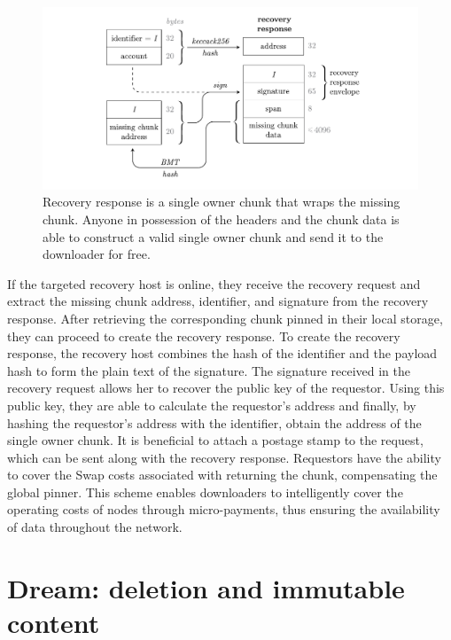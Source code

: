 \begin{figure}[htbp]
\centering
\includegraphics[width=\textwidth]{fig/recovery-response-2.pdf}
\caption[Recovery response \statusgreen]{Recovery response is a single owner chunk that wraps the missing chunk. Anyone in possession of the headers and the chunk data is able to construct a valid single owner chunk and send it to the downloader for free.}
\label{fig:recovery-response}
\end{figure}

If the targeted recovery host is online, they receive the recovery request and extract the missing chunk address, identifier, and signature from the recovery response. After retrieving the corresponding chunk pinned in their local storage, they can proceed to create the recovery response. To create the recovery response, the recovery host combines the hash of the identifier and the payload hash to form the plain text of the signature. The signature received in the recovery request allows her to recover the public key of the requestor. Using this public key, they are able to calculate the requestor's address and finally, by hashing the requestor's address with the identifier, obtain the address of the single owner chunk. It is beneficial to attach a postage stamp to the request, which can be sent along with the recovery response. Requestors have the ability to cover the Swap costs associated with returning the chunk, compensating the global pinner. This scheme enables downloaders to intelligently cover the operating costs of nodes through micro-payments, thus ensuring the availability of data throughout the network.

\section{Dream: deletion and immutable content}\label{sec:dream}





